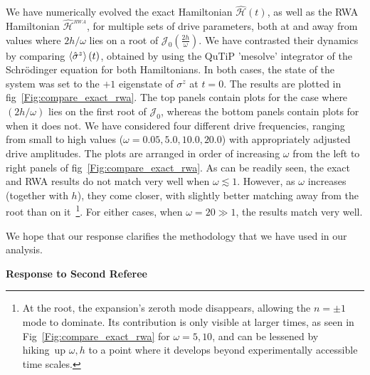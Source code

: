 \documentclass[aps,prb,reprint,showpacs,floatfix,superscriptaddress, onecolumn, nofootinbib, 9pt]{revtex4-2}
\newcommand{\ar}[1]{{\color{blue}#1}} %
\begin{document}
\begin{enumerate}
{We have numerically evolved the exact Hamiltonian $\hat{\mathcal{H}}(t)$, as well as the RWA Hamiltonian $\hat{\mathcal{H}}^{_{RWA}}$, for multiple sets of drive parameters, both at and away from values where $2h/\omega$ lies on a root of $\mathcal{J}_0\left(\frac{2h}{\omega}\right)$. We have contrasted their dynamics by comparing $\expval{\hat{\sigma}^z}(t)$, obtained by using the QuTiP 'mesolve' integrator of the Schr\"odinger equation for both Hamiltonians. In both cases, the state of the system was set to the $+1$ eigenstate of $\sigma^z$ at $t=0$. The results are plotted in fig~\ref{Fig:compare_exact_rwa}. The top panels contain plots for the case where $(2h/\omega)$ lies on the first root of $\mathcal{J}_0$, whereas the bottom panels contain plots for when it does not. We have considered four different drive frequencies, ranging from small to high values ($\omega = 0.05, 5.0, 10.0, 20.0$) with appropriately adjusted drive amplitudes. The plots are arranged in order of increasing $\omega$ from the left to right panels of fig~\ref{Fig:compare_exact_rwa}. As can be readily seen, the exact and RWA results do not match very well when $\omega \lesssim 1$. However, as $\omega$ increases (together with $h$), they come closer, with slightly better matching away from the root than on it~\footnote{\ar{At the root, the expansion's zeroth mode disappears, allowing the $n=\pm 1$ mode to dominate. Its contribution is only visible at larger times, as seen in Fig~\ref{Fig:compare_exact_rwa} for $\omega=5, 10$, and can be lessened by hiking up $\omega, h$ to a point where it develops beyond experimentally accessible time scales.}}. For either cases, when $\omega=20 \gg 1$, the results match very well.
    
    We hope that our response clarifies the methodology that we have used in our analysis.
    }
\end{enumerate}
  
\noindent \textbf{Response to Second Referee}
\end{document}
